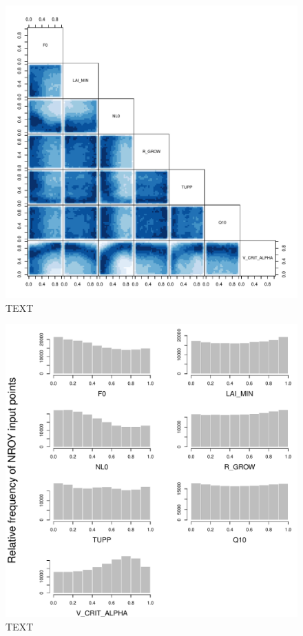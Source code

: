 \documentclass[esd, manuscript]{copernicus}
\begin{document}
\begin{figure}[t]
\includegraphics[width=12cm]{graphics/plausible_disc_input_space.pdf}
\caption{TEXT}
\label{fig:plausible_disc_input_space}
\end{figure}

\begin{figure}[t]
\includegraphics[width=12cm]{graphics/input_frequency_marginal.pdf}
\caption{TEXT}
\label{fig:input_frequency_marginal}
\end{figure}
\end{document}
